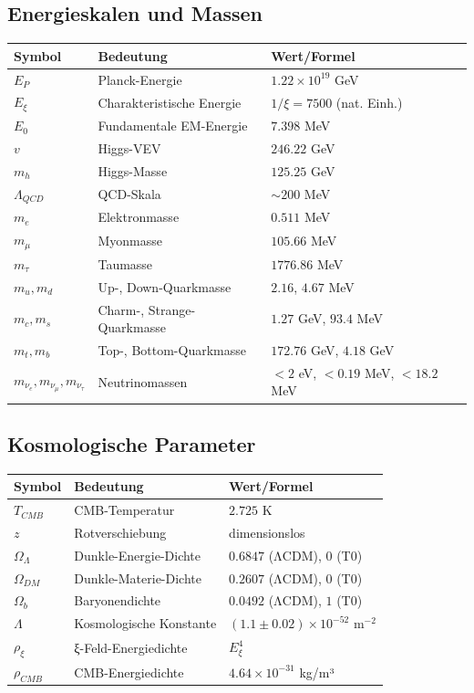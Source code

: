 \documentclass[12pt,a4paper]{article}
\begin{document}
\subsection{Energieskalen und Massen}
\begin{longtable}{lll}
	\toprule
	\textbf{Symbol} & \textbf{Bedeutung} & \textbf{Wert/Formel} \\
	\midrule
	$E_P$ & Planck-Energie & $1.22 \times 10^{19}$ GeV \\
	$E_\xi$ & Charakteristische Energie & $1/\xi = 7500$ (nat. Einh.) \\
	$E_0$ & Fundamentale EM-Energie & $7.398$ MeV \\
	$v$ & Higgs-VEV & $246.22$ GeV \\
	$m_h$ & Higgs-Masse & $125.25$ GeV \\
	$\Lambda_{QCD}$ & QCD-Skala & $\sim 200$ MeV \\
	$m_e$ & Elektronmasse & $0.511$ MeV \\
	$m_\mu$ & Myonmasse & $105.66$ MeV \\
	$m_\tau$ & Taumasse & $1776.86$ MeV \\
	$m_u, m_d$ & Up-, Down-Quarkmasse & $2.16$, $4.67$ MeV \\
	$m_c, m_s$ & Charm-, Strange-Quarkmasse & $1.27$ GeV, $93.4$ MeV \\
	$m_t, m_b$ & Top-, Bottom-Quarkmasse & $172.76$ GeV, $4.18$ GeV \\
	$m_{\nu_e}, m_{\nu_\mu}, m_{\nu_\tau}$ & Neutrinomassen & $< 2$ eV, $< 0.19$ MeV, $< 18.2$ MeV \\
	\bottomrule
\end{longtable}

\subsection{Kosmologische Parameter}
\begin{longtable}{lll}
	\toprule
	\textbf{Symbol} & \textbf{Bedeutung} & \textbf{Wert/Formel} \\
	\midrule
	$T_{CMB}$ & CMB-Temperatur & $2.725$ K \\
	$z$ & Rotverschiebung & dimensionslos \\
	$\Omega_\Lambda$ & Dunkle-Energie-Dichte & $0.6847$ (ΛCDM), $0$ (T0) \\
	$\Omega_{DM}$ & Dunkle-Materie-Dichte & $0.2607$ (ΛCDM), $0$ (T0) \\
	$\Omega_b$ & Baryonendichte & $0.0492$ (ΛCDM), $1$ (T0) \\
	$\Lambda$ & Kosmologische Konstante & $(1.1 \pm 0.02) \times 10^{-52}$ m$^{-2}$ \\
	$\rho_\xi$ & ξ-Feld-Energiedichte & $E_\xi^4$ \\
	$\rho_{CMB}$ & CMB-Energiedichte & $4.64 \times 10^{-31}$ kg/m³ \\
	\bottomrule
\end{longtable}
\end{document}
